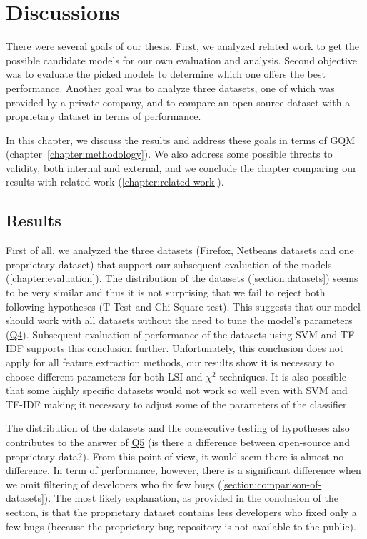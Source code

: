 \chapter{Discussions}

There were several goals of our thesis. First, we analyzed related work to get the possible candidate models for our own evaluation and analysis. Second objective was to evaluate the picked models to determine which one offers the best performance. Another goal was to analyze three datasets, one of which was provided by a private company, and to compare an open-source dataset with a proprietary dataset in terms of performance.

In this chapter, we discuss the results and address these goals in terms of GQM (chapter~\ref{chapter:methodology}). We also address some possible threats to validity, both internal and external, and we conclude the chapter comparing our results with related work (\autoref{chapter:related-work}).

\section{Results}

First of all, we analyzed the three datasets (Firefox, Netbeans datasets and one proprietary dataset) that support our subsequent evaluation of the models (\autoref{chapter:evaluation}). The distribution of the datasets (\autoref{section:datasets}) seems to be very similar and thus it is not surprising that we fail to reject both following hypotheses (T-Test and Chi-Square test). This suggests that our model should work with all datasets without the need to tune the model's parameters (\hyperlink{question:4}{Q4}). Subsequent evaluation of performance of the datasets using SVM and TF-IDF supports this conclusion further. Unfortunately, this conclusion does not apply for all feature extraction methods, our results show it is necessary to choose different parameters for both LSI and $\chi^2$ techniques. It is also possible that some highly specific datasets would not work so well even with SVM and TF-IDF making it necessary to adjust some of the parameters of the classifier.

The distribution of the datasets and the consecutive testing of hypotheses also contributes to the answer of \hyperlink{question:5}{Q5} (is there a difference between open-source and proprietary data?). From this point of view, it would seem there is almost no difference. In term of performance, however, there is a significant difference when we omit filtering of developers who fix few bugs (\autoref{section:comparison-of-datasets}). The most likely explanation, as provided in the conclusion of the section, is that the proprietary dataset contains less developers who fixed only a few bugs (because the proprietary bug repository is not available to the public).

